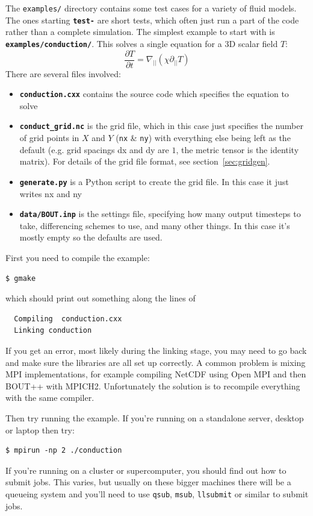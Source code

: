 \documentclass[12pt]{article}
\newcommand{\code}[1]{\texttt{#1}}
\newcommand{\file}[1]{\texttt{\bf #1}}
\newcommand{\deriv}[2]{\ensuremath{\frac{\partial #1}{\partial #2}}}
\begin{document}
The \texttt{examples/} directory contains some test cases for a variety of fluid models. The ones starting
\file{test-} are short tests, which often just run a part of the code rather than a complete simulation.
The simplest example to start with is \file{examples/conduction/}. This solves a single equation for
a 3D scalar field $T$:
\[
\deriv{T}{t} = \nabla_{||}\left(\chi\partial_{||} T\right)
\]
There are several files involved:
\begin{itemize}
\item \file{conduction.cxx} contains the source code which specifies the equation to solve
\item \file{conduct\_grid.nc} is the grid file, which in this case just specifies the number
  of grid points in $X$ and $Y$ (\code{nx} \& \code{ny}) with everything else being left as the default (e.g. grid
  spacings dx and dy are $1$, the metric tensor is the identity matrix). For details of the
  grid file format, see section~\ref{sec:gridgen}.
\item \file{generate.py} is a Python script to create the grid file. In this case it just
  writes nx and ny
\item \file{data/BOUT.inp} is the settings file, specifying how many output timesteps to take,
  differencing schemes to use, and many other things. In this case it's mostly empty so the defaults
  are used.
\end{itemize}

First you need to compile the example:
\begin{verbatim}
$ gmake
\end{verbatim}
which should print out something along the lines of
\begin{verbatim}
  Compiling  conduction.cxx
  Linking conduction
\end{verbatim}
If you get an error, most likely during the linking stage, you may need to go back and make sure the
libraries are all set up correctly. A common problem is mixing MPI implementations, for example compiling NetCDF using Open MPI and then BOUT++ with MPICH2. Unfortunately the solution is to recompile everything with the same compiler.

Then try running the example. If you're running on a standalone server, desktop or laptop then try:
\begin{verbatim}
$ mpirun -np 2 ./conduction
\end{verbatim}
If you're running on a cluster or supercomputer, you should find out how to submit jobs. This varies, but
usually on these bigger machines there will be a queueing system and you'll need to use \code{qsub},
\code{msub}, \code{llsubmit} or similar to submit jobs.
\end{document}
